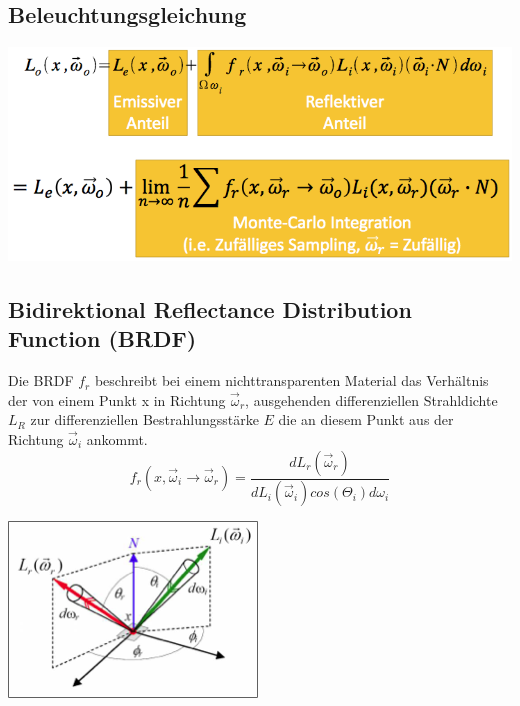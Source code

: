 \documentclass[10pt]{article}
\begin{document}
\subsection{Beleuchtungsgleichung}
\begin{center}
	\includegraphics[scale=0.5]{beleuchtungsgleichung.png}
\end{center}

\subsection{Bidirektional Reflectance Distribution Function (BRDF)}
Die BRDF $f_r$ beschreibt bei einem nichttransparenten Material das Verhältnis der von einem Punkt x in Richtung $\overrightarrow{\omega}_r$, ausgehenden differenziellen Strahldichte $L_R$ zur differenziellen Bestrahlungsstärke $E$ die an diesem Punkt aus der Richtung $\overrightarrow{\omega}_i$ ankommt.
\begin{equation}
	f_r(x, \overrightarrow{\omega}_i \rightarrow \overrightarrow{\omega}_r) = \frac{dL_r(\overrightarrow{\omega}_r)}{dL_i(\overrightarrow{\omega}_i)cos(\Theta_i)d\omega_i}
\end{equation}
\begin{center}
	\includegraphics[scale=0.5]{brdf.png}
\end{center}
\end{document}
